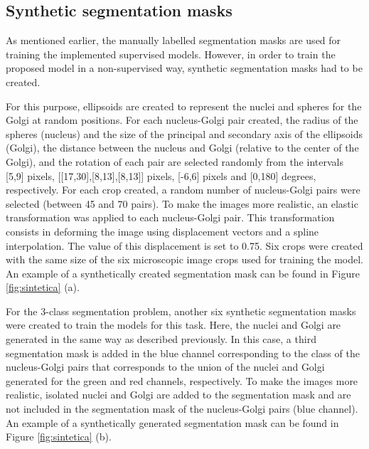 \subsection{Synthetic segmentation masks}
\label{subsection:synthetic_masks}

As mentioned earlier, the manually labelled segmentation masks are used for training the implemented supervised models. However, in order to train the proposed model in a non-supervised way, synthetic segmentation masks had to be created. 

For this purpose, ellipsoids are created to represent the nuclei and spheres for the Golgi at random positions. For each nucleus-Golgi pair created, the radius of the spheres (nucleus) and the size of the principal and secondary axis of the ellipsoids (Golgi), the distance between the nucleus and Golgi (relative to the center of the Golgi), and the rotation of each pair are selected randomly from the intervals [5,9] pixels, [[17,30],[8,13],[8,13]] pixels, [-6,6] pixels and [0,180] degrees, respectively. For each crop created, a random number of nucleus-Golgi pairs were selected (between 45 and 70 pairs). To make the images more realistic, an elastic transformation was applied to each nucleus-Golgi pair. This transformation consists in deforming the image using displacement vectors and a spline interpolation. The value of this displacement is set to 0.75. Six crops were created with the same size of the six microscopic image crops used for training the model. An example of a synthetically created segmentation mask can be found in Figure \ref{fig:sintetica} (a).

For the 3-class segmentation problem, another six synthetic segmentation masks were created to train the models for this task. Here, the nuclei and Golgi are generated in the same way as described previously. In this case, a third segmentation mask is added in the blue channel corresponding to the class of the nucleus-Golgi pairs that corresponds to the union of the nuclei and Golgi generated for the green and red channels, respectively. To make the images more realistic, isolated nuclei and Golgi are added to the segmentation mask and are not included in the segmentation mask of the nucleus-Golgi pairs (blue channel). An example of a synthetically generated segmentation mask can be found in Figure \ref{fig:sintetica} (b).


